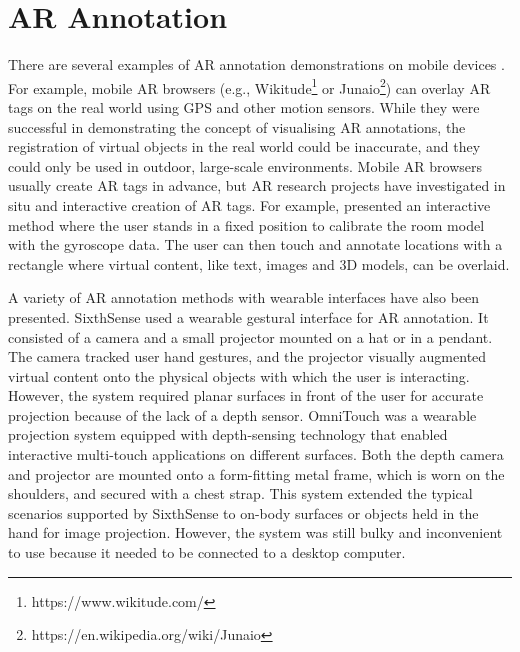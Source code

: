 
\section{AR Annotation}

There are several examples of AR annotation demonstrations on mobile devices \cite{Wither2009a, Gauglitz2014, Larabi2018, Grasset2012}. For example, mobile AR browsers (e.g., Wikitude\footnote{https://www.wikitude.com/} or Junaio\footnote{https://en.wikipedia.org/wiki/Junaio}) can overlay AR tags on the real world using GPS and other motion sensors. While they were successful in demonstrating the concept of visualising AR annotations, the registration of virtual objects in the real world could be inaccurate, and they could only be used in outdoor, large-scale environments. Mobile AR browsers usually create AR tags in advance, but  AR research projects have investigated in situ and interactive creation of AR tags. For example, \textcite{Kim2011} presented an interactive method where the user stands in a fixed position to calibrate the room model with the gyroscope data. The user can then touch and annotate locations with a rectangle where virtual content, like text, images and 3D models, can be overlaid. 

A variety of AR annotation methods with wearable interfaces have also been presented. SixthSense \cite{Mistry2009a} used a wearable gestural interface for AR annotation. It consisted of a camera and a small projector mounted on a hat or in a pendant. The camera tracked user hand gestures, and the projector visually augmented virtual content onto the physical objects with which the user is interacting. However, the system required planar surfaces in front of the user for accurate projection because of the lack of a depth sensor. OmniTouch \cite{Hollerer1999a} was a wearable projection system equipped with depth-sensing technology that enabled interactive multi-touch applications on different surfaces. Both the depth camera and projector are mounted onto a form-fitting metal frame, which is worn on the shoulders, and secured with a chest strap. This system extended the typical scenarios supported by SixthSense to on-body surfaces or objects held in the hand for image projection. However, the system was still bulky and inconvenient to use because it needed to be connected to a desktop computer.

